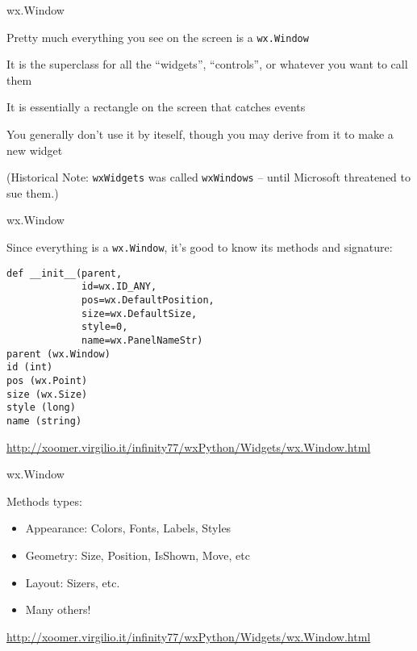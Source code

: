 \documentclass{beamer}
\begin{document}
\begin{frame}[fragile]{wx.Window}

\vfill
{\Large Pretty much everything you see on the screen is a \verb`wx.Window`}

\vfill
{\Large It is the superclass for all the ``widgets'', ``controls'', or whatever you want to call them}

\vfill
{\Large It is essentially a rectangle on the screen that catches events}

\vfill
{\Large You generally don't use it by iteself, though you may derive from it to make a new widget}

\vfill
{\large(Historical Note: \verb|wxWidgets| was called \verb|wxWindows| -- until Microsoft threatened to sue them.)}

\end{frame}

\begin{frame}[fragile]{wx.Window}

\vfill
{\Large Since everything is a \verb`wx.Window`, it's good to know its methods and signature:}
\begin{verbatim}
def __init__(parent,
             id=wx.ID_ANY,
             pos=wx.DefaultPosition,
             size=wx.DefaultSize,
             style=0,
             name=wx.PanelNameStr)
parent (wx.Window)
id (int)
pos (wx.Point)
size (wx.Size)
style (long)
name (string)
\end{verbatim}

\vfill
\url{http://xoomer.virgilio.it/infinity77/wxPython/Widgets/wx.Window.html}

\end{frame}



\begin{frame}[fragile]{wx.Window}

\vfill
{\Large Methods types:}
\begin{itemize}
  \item Appearance: Colors, Fonts, Labels, Styles
  \item Geometry: Size, Position, IsShown, Move, etc 
  \item Layout: Sizers, etc.
  \item Many others!
\end{itemize}

\vfill
\url{http://xoomer.virgilio.it/infinity77/wxPython/Widgets/wx.Window.html}

\end{frame}
\end{document}

